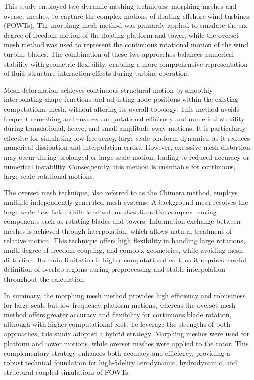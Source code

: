 \documentclass[%
 aip,
 amsmath,amssymb,
 reprint,%
]{revtex4-1}
\begin{document}
This study employed two dynamic meshing techniques: morphing meshes and overset meshes\citet{quallen2013cfd, tran2016fully}, to capture the complex motions of floating offshore wind turbines (FOWTs). The morphing mesh method was primarily applied to simulate the six-degree-of-freedom motion of the floating platform and tower, while the overset mesh method was used to represent the continuous rotational motion of the wind turbine blades. The combination of these two approaches balances numerical stability with geometric flexibility, enabling a more comprehensive representation of fluid–structure interaction effects during turbine operation.

Mesh deformation achieves continuous structural motion by smoothly interpolating shape functions and adjusting node positions within the existing computational mesh, without altering its overall topology. This method avoids frequent remeshing and ensures computational efficiency and numerical stability during translational, heave, and small-amplitude sway motions. It is particularly effective for simulating low-frequency, large-scale platform dynamics, as it reduces numerical dissipation and interpolation errors. However, excessive mesh distortion may occur during prolonged or large-scale motion, leading to reduced accuracy or numerical instability. Consequently, this method is unsuitable for continuous, large-scale rotational motions.

The overset mesh technique, also referred to as the Chimera method, employs multiple independently generated mesh systems. A background mesh resolves the large-scale flow field, while local sub-meshes discretize complex moving components such as rotating blades and towers. Information exchange between meshes is achieved through interpolation, which allows natural treatment of relative motion. This technique offers high flexibility in handling large rotations, multi-degree-of-freedom coupling, and complex geometries, while avoiding mesh distortion. Its main limitation is higher computational cost, as it requires careful definition of overlap regions during preprocessing and stable interpolation throughout the calculation.

In summary, the morphing mesh method provides high efficiency and robustness for large-scale but low-frequency platform motions, whereas the overset mesh method offers greater accuracy and flexibility for continuous blade rotation, although with higher computational cost. To leverage the strengths of both approaches, this study adopted a hybrid strategy. Morphing meshes were used for platform and tower motions, while overset meshes were applied to the rotor. This complementary strategy enhances both accuracy and efficiency, providing a robust technical foundation for high-fidelity aerodynamic, hydrodynamic, and structural coupled simulations of FOWTs.
\end{document}
